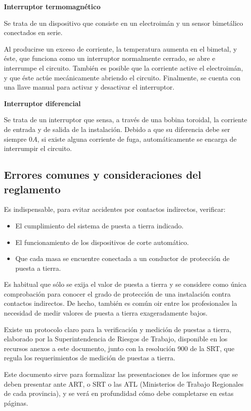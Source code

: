 \textbf{Interruptor termomagnético}

Se trata de un dispositivo que consiste en un electroimán y un sensor bimetálico conectados en serie.

Al producirse un exceso de corriente, la temperatura aumenta en el bimetal, y éste, que funciona como un interruptor normalmente cerrado, se abre e interrumpe el circuito. También es posible que la corriente active el electroimán, y que éste actúe mecánicamente abriendo el circuito. Finalmente, se cuenta con una llave manual para activar y desactivar el interruptor.

\textbf{Interruptor diferencial}

Se trata de un interruptor que sensa, a través de una bobina toroidal, la corriente de entrada y de salida de la instalación. Debido a que su diferencia debe ser siempre $0 A$, si existe alguna corriente de fuga, automáticamente se encarga de interrumpir el circuito.

\subsection{Errores comunes y consideraciones del reglamento}

Es indispensable, para evitar accidentes por contactos indirectos, verificar:
\begin{itemize}
	\item El cumplimiento del sistema de puesta a tierra indicado.
	\item El funcionamiento de los dispositivos de corte automático.
	\item Que cada masa se encuentre conectada a un conductor de protección de puesta a tierra.
\end{itemize}

Es habitual que sólo se exija el valor de puesta a tierra y se considere como única comprobación para conocer el grado de protección de una instalación contra contactos indirectos. De hecho, también es común oir entre los profesionales la necesidad de medir valores de puesta a tierra exageradamente bajos.

Existe un protocolo claro para la verificación y medición de puestas a tierra, elaborado por la Superintendencia de Riesgos de Trabajo, disponible en los recursos anexos a este documento, junto con la resolución 900 de la SRT, que regula los requerimientos de medición de puestas a tierra.

Este documento sirve para formalizar las presentaciones de los informes que se deben presentar ante ART, o SRT o las ATL (Ministerios de Trabajo Regionales de cada provincia), y se verá en profundidad cómo debe completarse en estas páginas.

